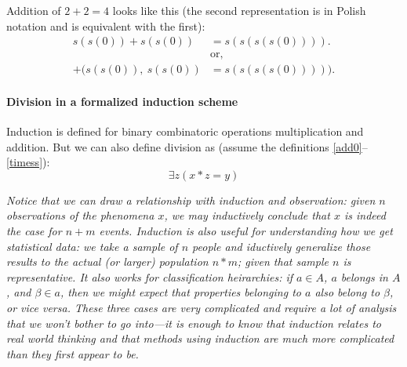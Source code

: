 \documentclass{article}
\begin{document}
Addition of $2 + 2 = 4$ looks like this (the second representation is in Polish notation and is equivalent with the first):
\begin{align*} 
s(s(0)) + s(s(0)) &= s(s(s(s(0)))).\\
&\text{or,}\\
 +(s(s(0)), \ s(s(0)) &= s(s(s(s(0))))).
\end{align*}


\paragraph{Division in a formalized induction scheme}
Induction is defined for binary combinatoric operations multiplication and addition. But we can also define division as (assume the definitions \ref{add0}--\ref{timess}):
\begin{equation}
    \exists z(x *z = y)
\end{equation}

\textsl{Notice that we can draw a relationship with induction and observation: given $n$ observations of the phenomena $x$, we may inductively conclude that $x$ is indeed the case for $n + m$ events. Induction is also useful for understanding how we get statistical data: we take a sample of $n$ people and iductively generalize those results to the actual (or larger) population $n * m$; given that sample $n$ is {\sl representative}. It also works for classification heirarchies: if $a \in A$, $a$ belongs in $A$, and $\beta \in a$, then we might expect that properties belonging to $a$ also belong to $\beta$, or {\sl vice versa}. These three cases are very complicated and require a lot of analysis that we won't bother to go into---it is enough to know that induction relates to real world thinking and that methods using induction are much more complicated than they first appear to be.}
\end{document}
